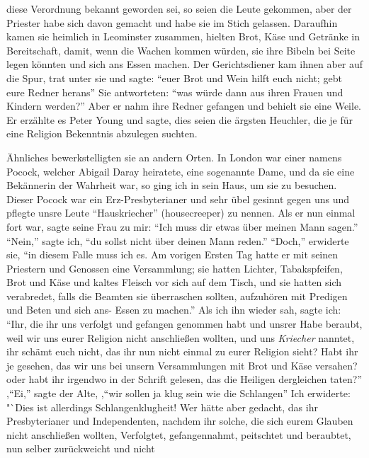 diese Verordnung bekannt geworden sei, so seien die Leute gekommen, 
aber der Priester habe sich davon gemacht und habe sie
im Stich gelassen. Daraufhin kamen sie heimlich in Leominster
zusammen, hielten Brot, Käse und Getränke in Bereitschaft, damit,
wenn die Wachen kommen würden, sie ihre Bibeln bei Seite legen
könnten und sich ans Essen machen. Der Gerichtsdiener kam
ihnen aber auf die Spur, trat unter sie und sagte: "`euer Brot
und Wein hilft euch nicht; gebt eure Redner herans"' Sie 
antworteten: "`was würde dann aus ihren Frauen und Kindern
werden?"' Aber er nahm ihre Redner gefangen und behielt sie
eine Weile. Er erzählte es Peter Young und sagte, dies seien
die ärgsten Heuchler, die je für eine Religion Bekenntnis 
abzulegen suchten.

Ähnliches bewerkstelligten sie an andern Orten. In London
war einer namens Pocock, welcher 
Abigail Daray heiratete, eine
sogenannte Dame, und da sie eine Bekännerin der Wahrheit war,
so ging ich in sein Haus, um sie zu besuchen. Dieser Pocock
war ein Erz-Presbyterianer und sehr übel gesinnt gegen uns
und pflegte unsre Leute "`Hauskriecher"' (housecreeper) zu nennen.
Als er nun einmal fort war, sagte seine Frau zu mir: "`Ich muss
dir etwas über meinen Mann sagen."' "`Nein,"' sagte ich, "`du
sollst nicht über deinen Mann reden."' "`Doch,"' erwiderte sie,
"`in diesem Falle muss ich es. Am vorigen Ersten Tag hatte
er mit seinen Priestern und Genossen eine Versammlung; sie hatten
Lichter, Tabakspfeifen, Brot und Käse und kaltes Fleisch vor sich
auf dem Tisch, und sie hatten sich verabredet, falls die Beamten
sie überraschen sollten, aufzuhören mit Predigen und Beten und
sich ans- Essen zu machen."' Als ich ihn wieder sah, sagte ich:
"`Ihr, die ihr uns verfolgt und gefangen genommen habt und
unsrer Habe beraubt, weil wir uns eurer Religion nicht anschließen 
wollten, und uns \textit{Kriecher} nanntet, ihr schämt euch nicht,
das ihr nun nicht einmal zu eurer Religion sieht? Habt ihr je
gesehen, das wir uns bei unsern Versammlungen mit Brot und
Käse versahen? oder habt ihr irgendwo in der Schrift gelesen,
das die Heiligen dergleichen taten?"' ,"`Ei,"' sagte der Alte, ,"`wir
sollen ja klug sein wie die Schlangen"' Ich erwiderte: "`Dies
ist allerdings Schlangenklugheit! Wer hätte aber gedacht, das
ihr Presbyterianer und Independenten, nachdem ihr solche, die
sich eurem Glauben nicht anschließen wollten, Verfolgtet, gefangennahmt,
peitschtet und beraubtet, nun selber zurückweicht und nicht

